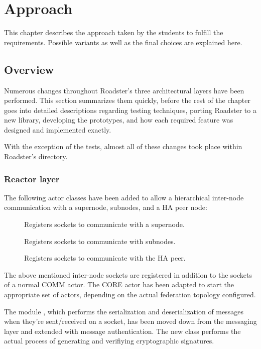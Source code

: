 \chapter{Approach}\label{ch:approach}
This chapter describes the approach taken by the students to fulfill the
requirements. Possible variants as well as the final choices are explained here.

\section{Overview}
Numerous changes throughout Roadster's three architectural layers have been
performed. This section summarizes them quickly, before the rest of the chapter
goes into detailed descriptions regarding testing techniques, porting Roadster
to a new \zmq library, developing the prototypes, and how each required feature
was designed and implemented exactly.

With the exception of the tests, almost all of these changes took place within
Roadster's  directory.

\subsection{Reactor layer}
The following actor classes have been added to allow a hierarchical inter-node
communication with a supernode, subnodes, and a HA peer node:
\begin{description}
	\item [] Registers sockets to communicate with a supernode.
	\item [] Registers sockets to communicate with subnodes.
	\item [] Registers sockets to communicate with the \gls{HA} peer.
\end{description}
The above mentioned inter-node sockets are registered in addition to the sockets of a normal COMM actor.
The CORE actor  has been adapted to start the
appropriate set of actors, depending on the actual federation topology
configured.

The module , which performs the serialization and
deserialization of messages when they're sent/received on a socket, has been
moved down from the messaging layer and extended with message authentication.
The new class  performs the actual
process of generating and verifiying cryptographic signatures.

